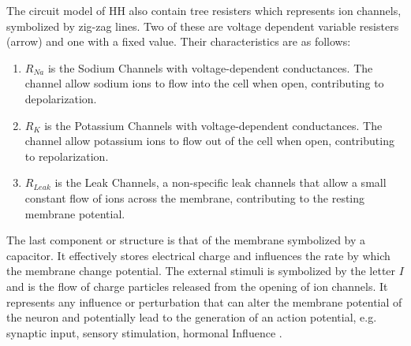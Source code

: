 \documentclass[class={myRUCProject}, crop=false]{standalone}
\begin{document}



The circuit model of HH also contain tree resisters which represents ion channels, symbolized by zig-zag lines. Two of these are voltage dependent variable resisters (arrow) and one with a fixed value. Their characteristics are as follows:

\begin{enumerate}
    \item $R_{Na}$ is the Sodium Channels with voltage-dependent conductances. The channel allow sodium ions to flow into the cell when open, contributing to depolarization.
    \item $R_K$ is the Potassium Channels with voltage-dependent conductances. The channel allow potassium ions to flow out of the cell when open, contributing to repolarization.
    \item $R_{Leak}$ is the Leak Channels, a non-specific leak channels that allow a small constant flow of ions across the membrane, contributing to the resting membrane potential.
\end{enumerate}

The last component or structure is that of the membrane symbolized by a capacitor. It effectively stores electrical charge and influences the rate by which the membrane change potential.
The external stimuli is symbolized by the letter $I$ and is the flow of charge particles released from the opening of ion channels. It represents any influence or perturbation that can alter the membrane potential of the neuron and potentially lead to the generation of an action potential, e.g. synaptic input, sensory stimulation, hormonal Influence \cite{EEGbook}.
\end{document}
